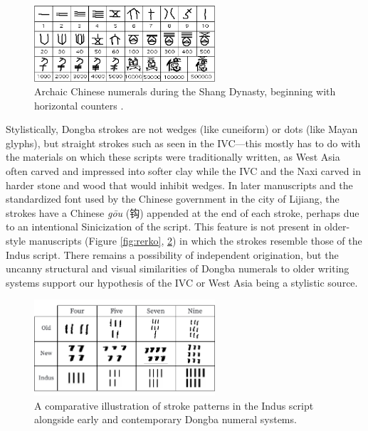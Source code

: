 \documentclass[11pt,a4paper,oneside]{report}
\begin{document}
\begin{figure}[H] 
    \centering
    \includegraphics[width=0.6\textwidth]{Images/7-Figure9-1.png}
    \caption[Shang Dynasty Chinese Numerals]{Archaic Chinese numerals during the Shang Dynasty, beginning with horizontal counters \cite{pande_numeral_2010}.}
    \label{fig:chinese_num}
\end{figure}

Stylistically, Dongba strokes are not wedges (like cuneiform) or dots (like Mayan glyphs), but straight strokes such as seen in the IVC—this mostly has to do with the materials on which these scripts were traditionally written, as West Asia often carved and impressed into softer clay while the IVC and the Naxi carved in harder stone and wood that would inhibit wedges. In later manuscripts and the standardized font used by the Chinese government in the city of Lijiang, the strokes have a Chinese \textit{gōu} (钩) appended at the end of each stroke, perhaps due to an intentional Sinicization of the script. This feature is not present in older-style manuscripts (Figure \ref{fig:rerko}, \ref{fig:dongba_num}) in which the strokes resemble those of the Indus script. There remains a possibility of independent origination, but the uncanny structural and visual similarities of Dongba numerals to older writing systems support our hypothesis of the IVC or West Asia being a stylistic source.

\begin{figure}[H] 
    \centering
    \includegraphics[width=0.6\textwidth]{Visualizations/Figures/Dongba_Numerals.pdf}
    \caption[Indus vs. Dongba Numeral Comparison Chart]{A comparative illustration of stroke patterns in the Indus script alongside early and contemporary Dongba numeral systems.}
    \label{fig:dongba_num}
\end{figure}
\end{document}
